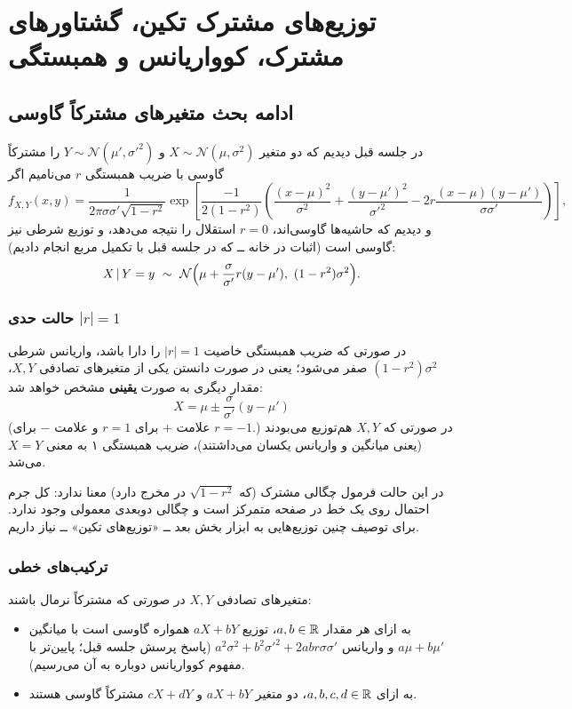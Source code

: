 \chapter{توزیع‌های مشترک تکین، گشتاورهای مشترک، کوواریانس و همبستگی}

\section{ادامه بحث متغیرهای مشترکاً گاوسی}

در جلسه قبل دیدیم که دو متغیر $X\sim\mathcal N(\mu,\sigma^2)$ و $Y\sim\mathcal N(\mu',\sigma'^2)$ را مشترکاً گاوسی با ضریب همبستگی $r$ می‌نامیم اگر
\[
f_{X,Y}(x,y)=\frac{1}{2\pi\sigma\sigma'\sqrt{1-r^2}}\exp\left[\frac{-1}{2(1-r^2)}\left(\frac{(x-\mu)^2}{\sigma^2}+\frac{(y-\mu')^2}{\sigma'^2}-2r\frac{(x-\mu)(y-\mu')}{\sigma\sigma'}\right)\right],
\]
و دیدیم که حاشیه‌ها گاوسی‌اند، $r=0$ استقلال را نتیجه می‌دهد، و توزیع شرطی نیز گاوسی است (\textcolor{red!70!black}{اثبات در خانه} ــ که در جلسه قبل با تکمیل مربع انجام دادیم):
\[
X\given Y=y\ \sim\ \mathcal N\Big(\mu+\frac{\sigma}{\sigma'}r(y-\mu'),\ (1-r^2)\sigma^2\Big).
\]

\subsection{حالت حدی $|r|=1$}
در صورتی که ضریب همبستگی خاصیت $|r|=1$ را دارا باشد، واریانس شرطی $(1-r^2)\sigma^2$ صفر می‌شود؛ یعنی در صورت دانستن یکی از متغیرهای تصادفی $X,Y$، مقدار دیگری به صورت \textbf{یقینی} مشخص خواهد شد:
\[
\boxed{\ X=\mu\pm\frac{\sigma}{\sigma'}(y-\mu')\ }
\]
(علامت $+$ برای $r=1$ و علامت $-$ برای $r=-1$.) در صورتی که $X,Y$ هم‌توزیع می‌بودند (یعنی میانگین و واریانس یکسان می‌داشتند)، ضریب همبستگی ۱ به معنی $X=Y$ می‌شد.

\begin{note}
\notetitle در این حالت فرمول چگالی مشترک (که $\sqrt{1-r^2}$ در مخرج دارد) معنا ندارد: کل جرم احتمال روی یک خط در صفحه متمرکز است و چگالی دوبعدی معمولی وجود ندارد. برای توصیف چنین توزیع‌هایی به ابزار بخش بعد ــ «توزیع‌های تکین» ــ نیاز داریم.
\end{note}

\subsection{ترکیب‌های خطی}
متغیرهای تصادفی $X,Y$ در صورتی که مشترکاً نرمال باشند:
\begin{itemize}
\item به ازای هر مقدار $a,b\in\mathbb{R}$، توزیع $aX+bY$ همواره گاوسی است با میانگین $a\mu+b\mu'$ و واریانس $a^2\sigma^2+b^2\sigma'^2+2abr\sigma\sigma'$ (پاسخ پرسش جلسه قبل؛ پایین‌تر با مفهوم کوواریانس دوباره به آن می‌رسیم).
\item به ازای $a,b,c,d\in\mathbb{R}$، دو متغیر $aX+bY$ و $cX+dY$ مشترکاً گاوسی هستند.
\end{itemize}

